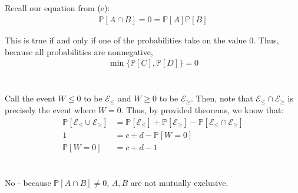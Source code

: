 \documentclass{article}
\newcommand{\how}[1]{\colorbox{BurntOrange}{\textbf{#1}}}
\begin{document}
\subsection{}
Recall our equation from (e):
\begin{align}
    \mathbb{P}[A \cap B] = 0 = \mathbb{P}[A] \mathbb{P}[B]
\end{align}

This is true if and only if one of the probabilities take on the value $0$. Thus, because all probabilities are nonnegative,
\begin{align}
    \min \{ \mathbb{P}[C], \mathbb{P}[D] \} = 0 
\end{align}

\newpage %
\section{}
Call the event $W \leq 0$ to be $\mathcal{E}_{\leq}$ and $W \geq 0$ to be $\mathcal{E}_\geq$. Then, note that $\mathcal{E}_\leq \cap \mathcal{E}_\geq$ is precisely the event where $W = 0$. Thus, by provided theorems, we know that:
\begin{align}
    \mathbb{P}[\mathcal{E}_\leq \cup \mathcal{E}_\geq] &= \mathbb{P}[\mathcal{E}_\leq] + \mathbb{P}[\mathcal{E}_\geq] - \mathbb{P}[\mathcal{E}_\leq \cap \mathcal{E}_\geq]  \\
    1 &= c + d - \mathbb{P}[W = 0] \\
    \mathbb{P}[W = 0] &= c + d - 1
\end{align}





\newpage %
\section{}
\subsection{}
No - because $\mathbb{P}[A \cap B] \neq 0$, $A, B$ are not mutually exclusive. 
\end{document}
